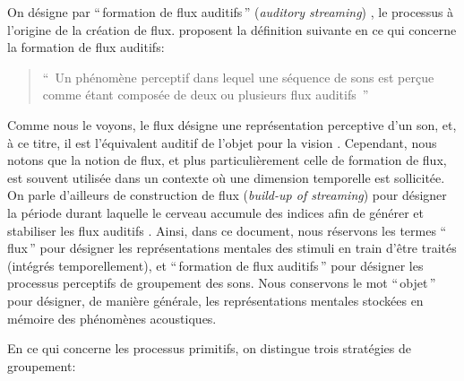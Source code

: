 On désigne par ``\,formation de flux auditifs\,'' (\emph{auditory streaming}) , le processus à l'origine de la création de flux. \citep{winkler2009modeling} proposent la définition suivante en ce qui concerne la formation de flux auditifs:

\begin{quote}
``\, Un phénomène perceptif dans lequel une séquence de sons est perçue comme étant composée de deux ou plusieurs flux auditifs \,''
\end{quote}

Comme nous le voyons, le flux désigne une représentation perceptive d'un son, et, à ce titre, il est l'équivalent auditif de l'objet pour la vision \citep[p. 11]{bregman1994auditory}. Cependant, nous notons que la notion de flux, et plus particulièrement celle de formation de flux, est souvent utilisée dans un contexte où une dimension temporelle est sollicitée. On parle d'ailleurs de construction de flux (\emph{build-up of streaming}) pour désigner la période durant laquelle le cerveau accumule des indices afin de générer et stabiliser les flux auditifs  \citep{cusack2004effects,snyder2007toward}. Ainsi, dans ce document, nous réservons les termes ``\,flux\,'' pour désigner les représentations mentales des stimuli en train d'être traités (intégrés temporellement), et ``\,formation de flux auditifs\,'' pour désigner les processus perceptifs de groupement des sons. Nous conservons le mot ``\,objet\,'' pour désigner, de manière générale, les représentations mentales stockées en mémoire des phénomènes acoustiques.

En ce qui concerne les processus primitifs, on distingue trois stratégies de groupement:

